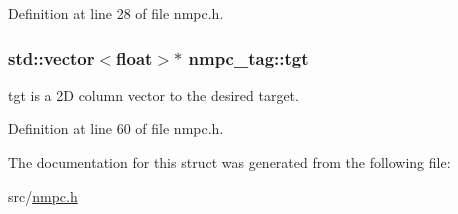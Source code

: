Definition at line 28 of file nmpc.\-h.

\hypertarget{structnmpc__tag_aa5fb945f7afd12e3724c6ce91e46c4a5}{
\subsubsection[{tgt}]{\setlength{\rightskip}{0pt plus 5cm}std\-::vector$<$float$>$$\ast$ nmpc\-\_\-tag\-::tgt}}\label{structnmpc__tag_aa5fb945f7afd12e3724c6ce91e46c4a5}
tgt is a 2\-D column vector to the desired target. 

Definition at line 60 of file nmpc.\-h.



The documentation for this struct was generated from the following file\-:\begin{DoxyCompactItemize}
\item 
src/\hyperlink{nmpc_8h}{nmpc.\-h}\end{DoxyCompactItemize}
